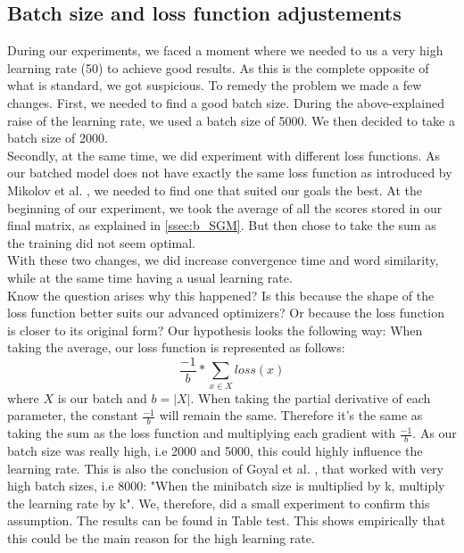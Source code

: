 \subsection{Batch size and loss function adjustements}\label{ssec:bs_lf}
During our experiments, we faced a moment where we needed to us a very high learning rate (50) to achieve good results. As this is the complete opposite of what is standard, we got suspicious. To remedy the problem we made a few changes. 
First, we needed to find a good batch size. During the above-explained raise of the learning rate, we used a batch size of 5000. We then decided to take a batch size of 2000.\\
 Secondly, at the same time, we did experiment with different loss functions. As our batched model does not have exactly the same loss function as introduced by Mikolov et al. \cite{mikolov}, we needed to find one that suited our goals the best. At the beginning of our experiment, we took the average of all the scores stored in our final matrix, as explained in \ref{ssec:b_SGM}. But then chose to take the sum as the training did not seem optimal.\\ 
 With these two changes, we did increase convergence time and word similarity, while at the same time having a usual learning rate. \\
 Know the question arises why this happened? Is this because the shape of the loss function better suits our advanced optimizers? Or because the loss function is closer to its original form? Our hypothesis looks the following way: 
 When taking the average, our loss function is represented as follows:
 \begin{equation}
 \frac{-1}{b }* \sum_{x\in X} loss(x)
 \end{equation}
where $X$ is our batch and $b = |X|$. 
When taking the partial derivative of each parameter, the constant $ \frac{-1}{b }$ will remain the same. Therefore it's the same as taking the sum as the loss function and multiplying each gradient with $\frac{-1}{b }$. As our batch size was really high, i.e 2000 and 5000, this could highly influence the learning rate. This is also the conclusion of Goyal et al. \cite{fb}, that worked with very high batch sizes, i.e 8000: "When the minibatch size is multiplied by k, multiply the learning rate by k". We, therefore, did a small experiment to confirm this assumption. The results can be found in Table test. This shows empirically that this could be the main reason for the high learning rate.

